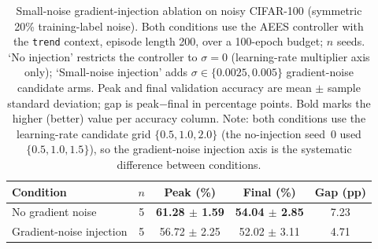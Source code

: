 \begin{table}[t]
\centering
\caption{Small-noise gradient-injection ablation on noisy CIFAR-100 (symmetric 20\% training-label noise). Both conditions use the AEES controller with the \texttt{trend} context, episode length 200, over a 100-epoch budget; $n$ seeds. `No injection' restricts the controller to $\sigma=0$ (learning-rate multiplier axis only); `Small-noise injection' adds $\sigma \in \{0.0025, 0.005\}$ gradient-noise candidate arms. Peak and final validation accuracy are mean $\pm$ sample standard deviation; gap is peak$-$final in percentage points. Bold marks the higher (better) value per accuracy column. Note: both conditions use the learning-rate candidate grid $\{0.5,1.0,2.0\}$ (the no-injection seed~0 used $\{0.5,1.0,1.5\}$), so the gradient-noise injection axis is the systematic difference between conditions.}
\label{tab:cifar_noise_ablation}
\small
\setlength{\tabcolsep}{6pt}
\begin{tabular}{lcccc}
\toprule
Condition & $n$ & Peak (\%) & Final (\%) & Gap (pp) \\
\midrule
No gradient noise & 5 & \textbf{61.28 $\pm$ 1.59} & \textbf{54.04 $\pm$ 2.85} & 7.23 \\
Gradient-noise injection & 5 & 56.72 $\pm$ 2.25 & 52.02 $\pm$ 3.11 & 4.71 \\
\bottomrule
\end{tabular}
\end{table}
